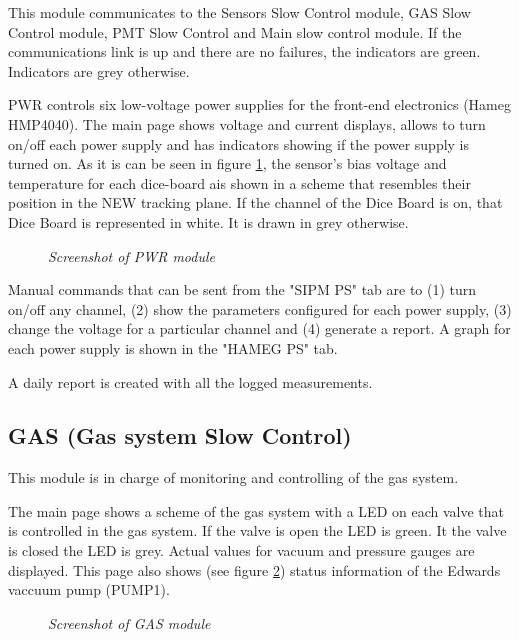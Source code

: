 This module communicates to the Sensors Slow Control module, GAS Slow Control module, PMT Slow Control and Main slow control module. If the communications link is up and there are no failures, the indicators are green. Indicators are grey otherwise.

PWR controls six low-voltage power supplies for the front-end electronics (Hameg HMP4040). The main page shows voltage and current displays, allows to turn on/off each power supply and has indicators showing if the power supply is turned on. As it is can be seen in figure \ref{fig:PWR:MAIN}, the sensor's bias voltage and temperature for each dice-board ais shown in a scheme that resembles their position in the NEW tracking plane. If the channel of the Dice Board is on, that Dice Board is represented in white. It is drawn in grey otherwise.

\begin{figure}[ht]
    \bigskip
    \begin{center}\leavevmode
        \caption{\textit{Screenshot of PWR module}}
        \label{fig:PWR:MAIN} 
    \end{center}
\end{figure}

Manual commands that can be sent from the "SIPM PS" tab are to (1) turn on/off any channel, (2) show the parameters configured for each power supply, (3) change the voltage for a particular channel and (4) generate a report.
A graph for each power supply is shown in the "HAMEG PS" tab.

A daily report is created with all the logged measurements. 
\subsection{GAS (Gas system Slow Control)}

This module is in charge of monitoring and controlling of the gas system. 

The main page shows a scheme of the gas system with a LED on each valve that is controlled in the gas system. If the valve is open the LED is green. It the valve is closed the LED is grey. Actual values for vacuum and pressure gauges are displayed. 
This page also shows (see figure \ref{fig:GAS:GAS}) status information of the Edwards vaccuum pump (PUMP1).

\begin{figure}[ht!]
    \bigskip
    \begin{center}\leavevmode
        \caption{\textit{Screenshot of GAS module}}
        \label{fig:GAS:GAS}
    \end{center}
\end{figure}


